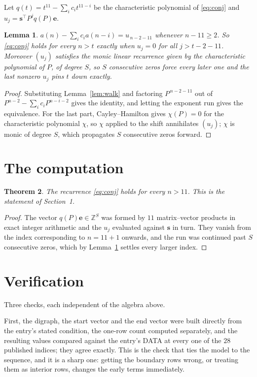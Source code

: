 \documentclass[11pt,a4paper]{article}
\theoremstyle{plain}
\newtheorem{theorem}{Theorem}
\newtheorem{lemma}[theorem]{Lemma}
\theoremstyle{definition}
\begin{document}
Let $q(t)=t^{11}-\sum_i c_i t^{11-i}$ be the characteristic polynomial of
\eqref{eq:conj} and $u_j=\mathbf{s}^{\!\top}P^{j}q(P)\mathbf{e}$.

\begin{lemma}\label{lem:crit}
$a(n)-\sum_i c_i a(n-i)=u_{\,n-2-11}$ whenever $n-11\ge2$. So \eqref{eq:conj}
holds for every $n>t$ exactly when $u_j=0$ for all $j>t-2-11$. Moreover $(u_j)$
satisfies the monic linear recurrence given by the characteristic polynomial of $P$, of
degree $S$, so $S$ consecutive zeros force every later one and the last nonzero $u_j$ pins
$t$ down exactly.
\end{lemma}

\begin{proof}
Substituting Lemma~\ref{lem:walk} and factoring $P^{\,n-2-11}$ out of
$P^{n-2}-\sum_i c_i P^{n-i-2}$ gives the identity, and letting the exponent run gives the
equivalence. For the last part, Cayley--Hamilton gives $\chi(P)=0$ for the characteristic
polynomial $\chi$, so $\chi$ applied to the shift annihilates $(u_j)$; $\chi$ is monic of
degree $S$, which propagates $S$ consecutive zeros forward.
\end{proof}

\section{The computation}

\begin{theorem}
The recurrence \eqref{eq:conj} holds for every $n>11$. This is the statement of
Section~1.
\end{theorem}

\begin{proof}
The vector $q(P)\mathbf{e}\in\mathbb{Z}^{S}$ was formed by $11$ matrix--vector
products in exact integer arithmetic and the $u_j$ evaluated against $\mathbf{s}$ in turn.
They vanish from the index corresponding to $n=11+1$ onwards, and the run was continued
past $S$ consecutive zeros, which by Lemma~\ref{lem:crit} settles every larger index.
\end{proof}

\section{Verification}

Three checks, each independent of the algebra above.

First, the digraph, the start vector and the end vector were built directly from the
entry's stated condition, the one-row count computed separately, and the resulting values
compared against the entry's DATA at every one of the $28$ published indices; they
agree exactly. This is the check that ties the model to the sequence, and it is a sharp one:
getting the boundary rows wrong, or treating them as interior rows, changes the early terms
immediately.
\end{document}
